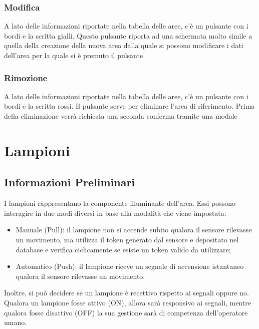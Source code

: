 \documentclass[a4paper, 12pt]{article}
\begin{document}
\subsubsection{Modifica}
A lato delle informazioni riportate nella tabella delle aree, c'è un pulsante con i bordi e la scritta gialli. Questo pulsante riporta ad una schermata molto simile a quella della creazione della nuova area dalla quale si possono modificare i dati dell'area per la quale si è premuto il pulsante

\subsubsection{Rimozione}
A lato delle informazioni riportate nella tabella delle aree, c'è un pulsante con i bordi e la scritta rossi. Il pulsante serve per eliminare l'area di riferimento. Prima della eliminazione verrà richiesta una seconda conferma tramite una modale

\newpage
\section{Lampioni}
\subsection{Informazioni Preliminari}
I lampioni rappresentano la componente illuminante dell'area. Essi possono interagire in due modi diversi in base alla modalità che viene impostata:
\begin{itemize}
    \item Manuale (Pull): il lampione non si accende subito qualora il sensore rilevasse un movimento, ma utilizza il token generato dal sensore e depositato nel database e verifica ciclicamente se esiste un token valido da utilizzare;
    \item Automatico (Push): il lampione riceve un segnale di accensione istantaneo qualora il sensore rilevasse un movimento.
\end{itemize}
Inoltre, si può decidere se un lampione è recettivo rispetto ai segnali oppure no. Qualora un lampione fosse attivo (ON), allora sarà responsivo ai segnali, mentre qualora fosse disattivo (OFF) la sua gestione sarà di competenza dell'operatore umano.
\end{document}
